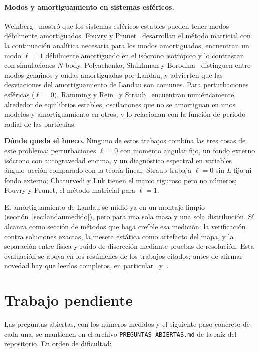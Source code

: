 \documentclass[11pt,a4paper]{article}
\theoremstyle{definition}
\begin{document}
\paragraph{Modos y amortiguamiento en sistemas esféricos.} Weinberg~\cite{weinberg1994}
mostró que los sistemas esféricos estables pueden tener modos débilmente
amortiguados. Fouvry y Prunet~\cite{fouvry2022} desarrollan el método matricial con
la continuación analítica necesaria para los modos amortiguados, encuentran un modo
$\ell=1$ débilmente amortiguado en el isócrono isotrópico y lo contrastan con
simulaciones $N$-body. Polyachenko, Shukhman y Borodina~\cite{polyachenko2021}
distinguen entre modos genuinos y ondas amortiguadas por Landau, y advierten que las
desviaciones del amortiguamiento de Landau son comunes. Para perturbaciones esféricas
($\ell=0$), Ramming y Rein~\cite{ramming2018} y Straub~\cite{straub2024} encuentran
numéricamente, alrededor de equilibrios estables, oscilaciones que no se amortiguan en
unos modelos y amortiguamiento en otros, y lo relacionan con la función de periodo
radial de las partículas.

\begin{idea}
\textbf{Dónde queda el hueco.} Ninguno de estos trabajos combina las tres cosas de
este problema: perturbaciones $\ell=0$ con momento angular fijo, un fondo externo
isócrono con autogravedad encima, y un diagnóstico espectral en variables
ángulo--acción comparado con la teoría lineal. Straub trabaja $\ell=0$ sin $L$ fijo ni
fondo externo; Chaturvedi y Luk tienen el marco riguroso pero no números; Fouvry y
Prunet, el método matricial para $\ell=1$.

\medskip
El amortiguamiento de Landau se midió ya en un montaje limpio
(sección~\ref{sec:landaumedido}), pero para una sola masa y una sola distribución. Sí alcanza como
sección de métodos que haga creíble esa medición: la verificación contra soluciones
exactas, la meseta estática como artefacto del mapa, y la separación entre física y
ruido de discreción mediante pruebas de resolución. Esta evaluación se apoya en los
resúmenes de los trabajos citados; antes de afirmar novedad hay que leerlos completos,
en particular~\cite{straub2024} y~\cite{fouvry2022}.
\end{idea}

\section{Trabajo pendiente}

Las preguntas abiertas, con los números medidos y el siguiente paso concreto de
cada una, se mantienen en el archivo \texttt{PREGUNTAS\_ABIERTAS.md} de la raíz del
repositorio. En orden de dificultad:
\end{document}
